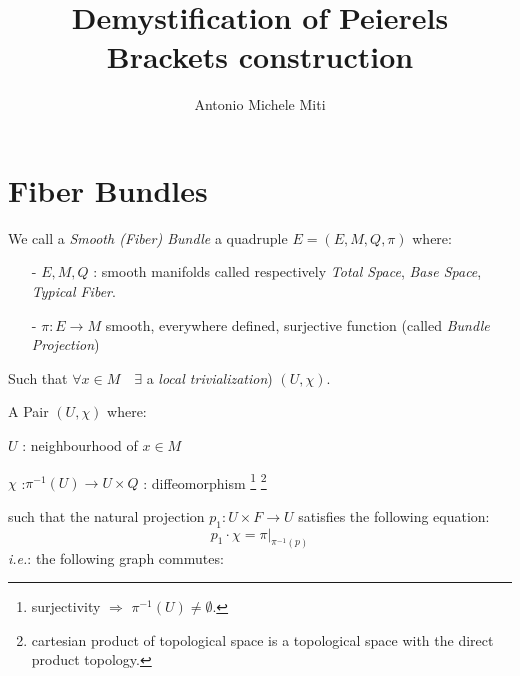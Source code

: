\documentclass[a4paper,10pt,smallheadings]{scrartcl}
\title{Demystification of Peierels Brackets construction}
\author{Antonio Michele Miti}
\date{\vspace{-5ex}} %
\begin{document}

\section{Fiber Bundles}
\begin{definition}\label{Def:SmoothBundle}
				We call a \emph{Smooth (Fiber) Bundle}  a quadruple $E = (E,M,Q,\pi)$ where:
				\begin{itemize}
					\item[-] $E,M,Q$ :  smooth manifolds called respectively \emph{Total Space}, \emph{Base Space}, \emph{Typical Fiber}.
					\item[-] $\pi : E \rightarrow M $ smooth, everywhere defined, surjective function (called \emph{Bundle Projection})
				\end{itemize}
				Such that $\forall x \in M \quad \exists$ a \emph{local trivialization}) $(U, \chi)$.
				
	\end{definition}
	
	\begin{definition}				
		A Pair $(U, \chi)$ where:
					\begin{compactitemize}
						\item $U$ : neighbourhood of $x \in M$
						\item $\chi$ :$\pi^{-1}(U) \rightarrow U \times Q$ : diffeomorphism
 							\footnote{surjectivity $\Rightarrow$ $\pi^{-1}(U) \neq \emptyset$.}
 							\footnote{cartesian product of topological space is a topological space with the direct product topology.}
					\end{compactitemize}
				such that the natural projection $p_1 : U \times F \rightarrow U$ satisfies the following equation: $$p_1 \cdot \chi = \pi \vert_{\pi^{-1}(p)}$$
					\textit{i.e.}: the following graph commutes:
					\vspace{-2mm}
					\begin{center}
					\end{center}
			\end{definition}
\end{document}
